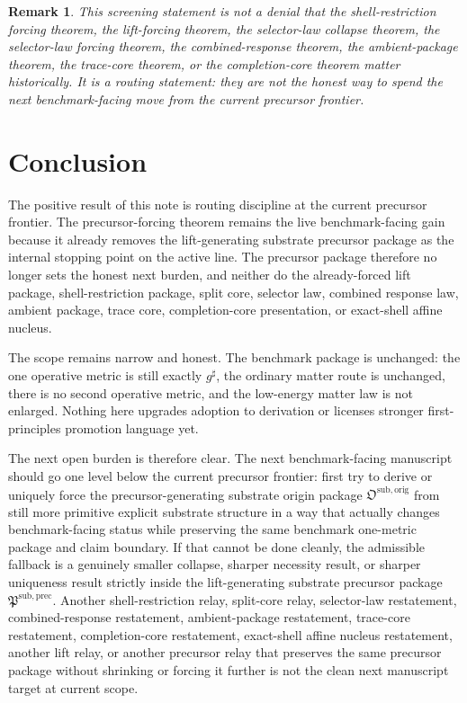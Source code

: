 \documentclass[11pt]{article}
\newcommand{\CompletedMetric}{g^{\sharp}}
\newcommand{\PrecursorPackage}{\mathfrak P^{\mathrm{sub,prec}}}
\newcommand{\OriginPackage}{\mathfrak O^{\mathrm{sub,orig}}}
\newtheorem{remark}{Remark}
\begin{document}
\begin{remark}
This screening statement is not a denial that the shell-restriction forcing theorem, the lift-forcing theorem, the selector-law collapse theorem, the selector-law forcing theorem, the combined-response theorem, the ambient-package theorem, the trace-core theorem, or the completion-core theorem matter historically. It is a routing statement: they are not the honest way to spend the next benchmark-facing move from the current precursor frontier.
\end{remark}

\section{Conclusion}

The positive result of this note is routing discipline at the current precursor frontier. The precursor-forcing theorem remains the live benchmark-facing gain because it already removes the lift-generating substrate precursor package as the internal stopping point on the active line. The precursor package therefore no longer sets the honest next burden, and neither do the already-forced lift package, shell-restriction package, split core, selector law, combined response law, ambient package, trace core, completion-core presentation, or exact-shell affine nucleus.

The scope remains narrow and honest. The benchmark package is unchanged: the one operative metric is still exactly \(\CompletedMetric\), the ordinary matter route is unchanged, there is no second operative metric, and the low-energy matter law is not enlarged. Nothing here upgrades adoption to derivation or licenses stronger first-principles promotion language yet.

The next open burden is therefore clear. The next benchmark-facing manuscript should go one level below the current precursor frontier: first try to derive or uniquely force the precursor-generating substrate origin package \(\OriginPackage\) from still more primitive explicit substrate structure in a way that actually changes benchmark-facing status while preserving the same benchmark one-metric package and claim boundary. If that cannot be done cleanly, the admissible fallback is a genuinely smaller collapse, sharper necessity result, or sharper uniqueness result strictly inside the lift-generating substrate precursor package \(\PrecursorPackage\). Another shell-restriction relay, split-core relay, selector-law restatement, combined-response restatement, ambient-package restatement, trace-core restatement, completion-core restatement, exact-shell affine nucleus restatement, another lift relay, or another precursor relay that preserves the same precursor package without shrinking or forcing it further is not the clean next manuscript target at current scope.
\end{document}
